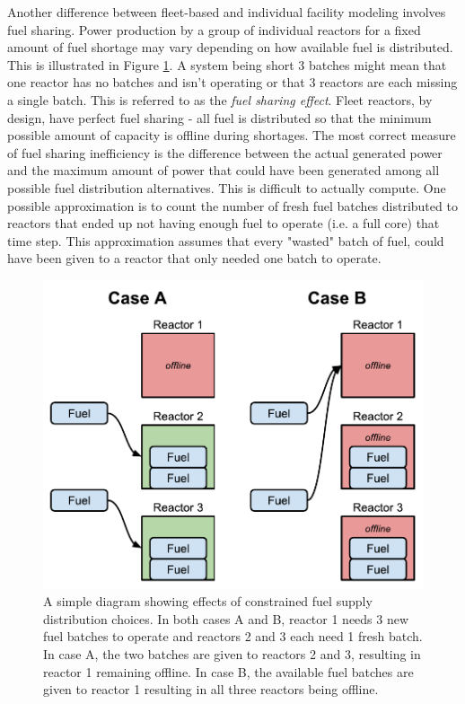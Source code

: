 \documentclass{style}
\begin{document}
Another difference between fleet-based and individual facility modeling
involves fuel sharing.  Power production by a group of individual reactors for
a fixed amount of fuel shortage may vary depending on how available fuel is
distributed.  This is illustrated in Figure \ref{fig:fuel-sharing}.  A system
being short 3 batches might mean that one reactor has no batches and isn't
operating or that 3 reactors are each missing a single batch.  This is
referred to as the \emph{fuel sharing effect}.  Fleet reactors, by design,
have perfect fuel sharing - all fuel is distributed so that the minimum
possible amount of capacity is offline during shortages. The most correct
measure of fuel sharing inefficiency is the difference between the actual
generated power and the maximum amount of power that could have been generated
among all possible fuel distribution alternatives.  This is difficult to
actually compute. One possible approximation is to count the number of fresh
fuel batches distributed to reactors that ended up not having enough fuel to
operate (i.e. a full core) that time step.  This approximation assumes that
every "wasted" batch of fuel, could have been given to a reactor that only
needed one batch to operate.

\begin{figure}[h]
    \centering
    \includegraphics[width=0.8\columnwidth]{exp2/fuel-sharing.pdf}
    \caption[The fuel sharing effect]{
        A simple diagram showing effects of constrained fuel supply
        distribution choices. In both cases A and B, reactor 1 needs 3 new
        fuel batches to operate and reactors 2 and 3 each need 1 fresh batch.
        In case A, the two batches are given to reactors 2 and 3, resulting in
        reactor 1 remaining offline. In case B, the available fuel batches are
        given to reactor 1 resulting in all three reactors being offline.
    }
    \label{fig:fuel-sharing}
\end{figure}
\end{document}
